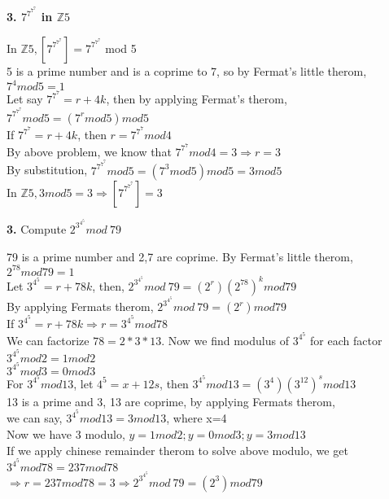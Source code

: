 \documentclass [12pt]{article}
\theoremstyle{definition}
\begin{document}
\phantom{1em} {\bf 3. $7^{7^{7^{7}}}$  in $ \mathds {Z}5$ }

\phantom{1em} In $ \mathds {Z}5, [7^{7^{7^{7}}}] = 7^{7^{7^{7}}} $ mod 5 \\
\phantom{1em} 5 is a prime number and is a coprime to 7, so by Fermat's little therom, $7^{4}mod5 = 1$\\
\phantom{1em} Let say $7^{7^{7}} = r + 4k$, then by applying Fermat's therom, $7^{7^{7^{7}}}  mod 5 = (7^{r} mod5)mod5$\\
\phantom{1em} If  $7^{7^{7}} = r + 4k$, then $r = 7^{7^{7}} mod 4$\\
\phantom{1em} By above problem, we know that $7^{7^{7}} mod 4 = 3 \Longrightarrow r = 3$\\
\phantom{1em} By substitution, $7^{7^{7^{7}}} mod 5 =  (7^{3} mod5)mod5 = 3mod5$\\
\phantom{1em} In  $ \mathds {Z}5, 3mod5 = 3 \Longrightarrow [7^{7^{7^{7}}}] = 3$

{\bf 3.} Compute $2^{3^{4^{5}}} mod \ 79$

\phantom{1em} 79 is a prime number and 2,7 are coprime. By Fermat's little therom, $2^{78} mod 79 = 1$\\
\phantom{1em} Let $3^{4^{5}} = r + 78k$, then, $2^{3^{4^{5}}} mod \ 79 = (2^{r})(2^{78})^{k}mod79$\\
\phantom{1em} By applying Fermats therom, $2^{3^{4^{5}}} mod \ 79 = (2^{r})mod79$ \\
\phantom{1em} If $3^{4^{5}} = r + 78k \Longrightarrow r =  3^{4^{5}} mod 78$ \\
\phantom{1em} We can factorize $78 = 2 * 3* 13$. Now we find modulus of $3^{4^{5}}$ for each factor \\ 
\phantom{1em} $3^{4^{5}} mod 2 = 1 mod 2$ \\
\phantom{1em} $3^{4^{5}} mod 3 = 0 mod 3$ \\
\phantom{1em} For $3^{4^{5}} mod 13$, let $4^{5} = x + 12s$, then $3^{4^{5}} mod 13 = (3^{4})(3^{12})^{s}mod13$\\
\phantom{1em} 13 is a prime and 3, 13 are coprime, by applying Fermats therom, \\
\phantom{1em} we can say, $3^{4^{5}} mod 13 = 3 mod 13$, where x=4\\
\phantom{1em} Now we have 3 modulo, $y = 1 mod 2; y = 0 mod 3; y= 3 mod 13$\\
\phantom{1em} If we apply chinese remainder therom to solve above modulo, we get $3^{4^{5}} mod 78 = 237 mod 78$\\
\phantom{1em} $\Longrightarrow r = 237 mod 78 = 3 \Longrightarrow  2^{3^{4^{5}}} mod \ 79 = (2^{3})mod79$\\
\end{document}
